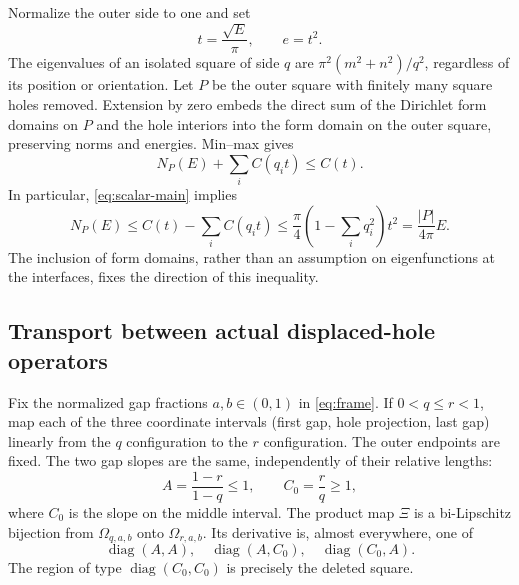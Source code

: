 \documentclass[11pt,reqno]{amsart}
\numberwithin{equation}{section}
\newcommand{\Om}{\Omega}
\begin{document}
Normalize the outer side to one and set
\begin{equation}\label{eq:energy-normalization}
 t=\frac{\sqrt E}{\pi},\qquad e=t^2.
\end{equation}
The eigenvalues of an isolated square of side $q$ are
$\pi^2(m^2+n^2)/q^2$, regardless of its position or orientation.
Let $P$ be the outer square with finitely many square holes
removed. Extension by zero embeds the direct sum of the
Dirichlet form domains on $P$ and the hole interiors into the
form domain on the outer square, preserving norms and energies.
Min--max gives
\begin{equation}\label{eq:subtraction}
 N_P(E)+\sum_i C(q_it)\le C(t).
\end{equation}
In particular, \eqref{eq:scalar-main} implies
\begin{equation}\label{eq:subtraction-weyl}
 N_P(E)\le C(t)-\sum_iC(q_it)
 \le\frac\pi4\left(1-\sum_iq_i^2\right)t^2
 =\frac{|P|}{4\pi}E.
\end{equation}
The inclusion of form domains, rather than an assumption on
eigenfunctions at the interfaces, fixes the direction of this
inequality.

\subsection*{Transport between actual displaced-hole operators}

Fix the normalized gap fractions $a,b\in(0,1)$ in
\eqref{eq:frame}. If $0<q\le r<1$, map each of the three
coordinate intervals (first gap, hole projection, last gap)
linearly from the $q$ configuration to the $r$ configuration.
The outer endpoints are fixed. The two gap slopes are the same,
independently of their relative lengths:
\[
 A=\frac{1-r}{1-q}\le1,\qquad C_0=\frac rq\ge1,
\]
where $C_0$ is the slope on the middle interval. The product map
$\Xi$ is a bi-Lipschitz bijection from $\Om_{q,a,b}$ onto
$\Om_{r,a,b}$. Its derivative is, almost everywhere, one of
\[
 \operatorname{diag}(A,A),\quad
 \operatorname{diag}(A,C_0),\quad
 \operatorname{diag}(C_0,A).
\]
The region of type $\operatorname{diag}(C_0,C_0)$ is precisely
the deleted square.
\end{document}
